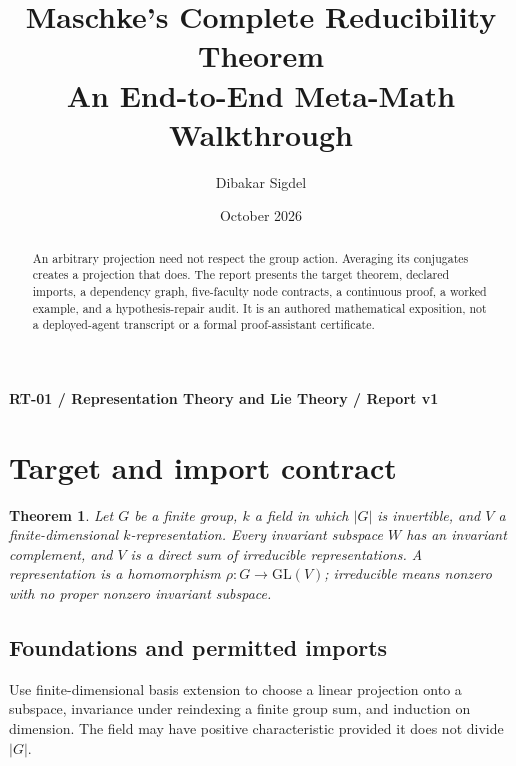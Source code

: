 \documentclass[preprint,12pt,aps,pra,showkeys,amsmath,amssymb,superscriptaddress,floatfix]{revtex4-2}
\newtheorem{theorem}{Theorem}[section]
\theoremstyle{definition}
\theoremstyle{remark}
\begin{document}
\title{Maschke's Complete Reducibility Theorem\\[4pt]\large An End-to-End Meta-Math Walkthrough}

\author{Dibakar Sigdel}


\date{October 2026}

\begin{abstract}

An arbitrary projection need not respect the group action. Averaging its
conjugates creates a projection that does. The report presents the
target theorem, declared imports, a dependency graph, five-faculty node
contracts, a continuous proof, a worked example, and a hypothesis-repair
audit. It is an authored mathematical exposition, not a deployed-agent
transcript or a formal proof-assistant certificate.

\end{abstract}\maketitle\linespread{1.12}\selectfont

\noindent\textbf{RT-01 / Representation Theory and Lie Theory / Report v1}

\section{Target and import contract}

\begin{theorem}

Let \(G\) be a finite group, \(k\) a field in which \(|G|\) is
invertible, and \(V\) a finite-dimensional \(k\)-representation. Every
invariant subspace \(W\) has an invariant complement, and \(V\) is a
direct sum of irreducible representations. A representation is a
homomorphism \(\rho:G\to\mathrm{GL}(V)\); irreducible means nonzero with
no proper nonzero invariant subspace.

\end{theorem}

\subsection{Foundations and permitted imports}

Use finite-dimensional basis extension to choose a linear projection
onto a subspace, invariance under reindexing a finite group sum, and
induction on dimension. The field may have positive characteristic
provided it does not divide \(|G|\).
\end{document}
